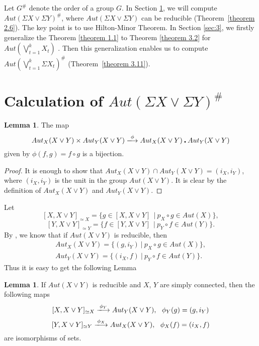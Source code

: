 \documentclass[12pt]{article}
\theoremstyle{theorem}
\theoremstyle{definition}
\theoremstyle{proposition}
\theoremstyle{corollary}
\theoremstyle{lemma}
\newtheorem{lemma}[theorem]{Lemma}
\theoremstyle{remark}
\theoremstyle{example}
\begin{document}
{ Let $G^{\#}$ denote the order of a group $G$. In Section \ref{sec:2}, we will compute  $Aut(\Sigma X\vee \Sigma Y)^\#$, where $Aut(\Sigma X\vee \Sigma Y)$ can be reducible (Theorem~\ref{theorem 2.6}). The key point is to use Hilton-Minor Theorem.  In Section \ref{sec:3}, we firstly generalize the Theorem \ref{theorem 1.1} to Theorem \ref{theorem 3.2} for  $ Aut(\bigvee\limits_{t=1}^{k}X_{t})$ . Then this generalization enables us to compute  $ Aut(\bigvee\limits_{t=1}^{k}\Sigma X_{t})^{\#}$ (Theorem~\ref{theorem 3.11}).

\section{ Calculation of $Aut(\Sigma X\vee \Sigma Y)^{\#}$  }
\label{sec:2}
\begin{lemma}\label{lemma 2.1}
 The map
 $$  Aut_{X}(X\vee Y)\times  Aut_{Y}(X\vee Y) \xlongrightarrow{\phi}   Aut_{X}(X\vee Y)\centerdot Aut_{Y}(X\vee Y)$$
   given by $\phi(f,g)=f{\ensuremath{{\scriptstyle\circ}}} g$ is a bijection.
\end{lemma}
\begin{proof}
 It is enough to show that $Aut_{X}(X\vee Y)\cap Aut_{Y}(X\vee Y)=(i_{X},i_{Y})$, where $(i_{X},i_{Y})$ is the unit in the group $Aut(X\vee Y)$. It is clear by the definition of $Aut_{X}(X\vee Y)$ and $Aut_{Y}(X\vee Y)$.
\end{proof}
 Let $$[X,X\vee Y]_{\simeq X}=\{g\in [X,X\vee Y]~~|~ p_{X}{\ensuremath{{\scriptstyle\circ}}} g\in Aut(X) \},$$
   $$[Y,X\vee Y]_{\simeq Y}=\{f\in [Y,X\vee Y]~~|~ p_{Y}{\ensuremath{{\scriptstyle\circ}}} f\in Aut(Y) \}.$$
 By \cite{YS1}, we know that if $Aut(X\vee Y)$ is reducible, then
  \begin{align}
  Aut_{X}(X\vee Y)=\{(g, i_{Y})~|~ p_{X}{\ensuremath{{\scriptstyle\circ}}} g\in Aut(X)\}, \label{eq:1}\\
  Aut_{Y}(X\vee Y)=\{(i_{X},f)~|~ p_{Y}{\ensuremath{{\scriptstyle\circ}}} f\in Aut(Y)\}.   \label{eq:2}
\end{align}
    Thus it is easy to get the following Lemma
 \begin{lemma}\label{lemma 2.2}
  If $Aut(X\vee Y)$ is reducible and $X$, $Y$ are simply connected, then the following maps
  $$[X,X\vee Y]_{\simeq X} \xlongrightarrow{\phi_{Y}} Aut_{Y}(X\vee Y), ~~\phi_{Y}(g)=(g, i_{Y})$$
  $$[Y,X\vee Y]_{\simeq Y} \xlongrightarrow{\phi_{X}} Aut_{X}(X\vee Y), ~~\phi_{X}(f)=(i_{X},f)$$
  are isomorphisms of sets.
  \end{lemma}

}
\end{document}
